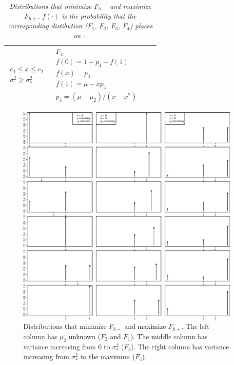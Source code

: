 \documentclass{article}
\newcommand{\Fmin}{F_{h-}}
\newcommand{\Fmax}{F_{h+}}
\newcommand{\shortcaption}{} %
\begin{document}
\begin{table}
\begin{tabular}{llll}
\\ \hline

$\begin{array}{l}
  c_1 \le x \le c_2 \\
  \sigma^2 \ge \sigma^2_*
\end{array}$
  &$\begin{array}{l}
    F_{4}\\
    f(0) = 1 - p_4 - f(1)\\
    f(x) = p_4\\
    f(1) = \mu - x p_4\\
    p_4 = (\mu-\mu_2)/(x-x^2)
   \end{array}$
\\ \hline
\end{tabular}
\renewcommand{\shortcaption}{Distributions that minimize $\Fmin$ and maximize $\Fmax$.}
\caption[\shortcaption]{\label{table:optimalDistributions}
\em \shortcaption{}
$f(\cdot)$ is the probability that the corresponding distibution
($F_1$, $F_2$, $F_3$, $F_4$) places on $\cdot$.
%
}
\end{table}


\begin{figure}
\centering
\includegraphics[width=\linewidth]{densities.pdf}
\caption{Distributions that minimize $\Fmin$ and maximize $\Fmax$.
The left column has $\mu_2$ unknown ($F_2$ and $F_1$).
The middle column has variance increasing from 0 to $\sigma_*^2$ ($F_3$).
The right column has variance increasing from $\sigma_*^2$ to the
maximum ($F_4$).
\label{fig:densities}
}
\end{figure}
\end{document}

